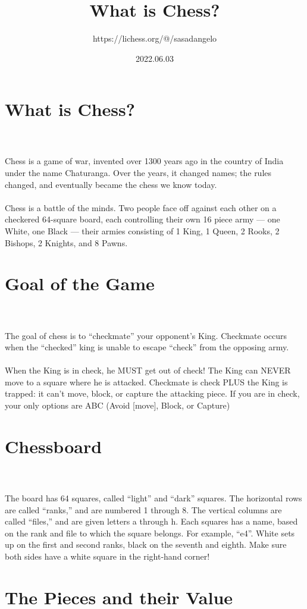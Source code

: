 \documentclass{article}
\title{What is Chess?}
\author{https://lichess.org/@/sasadangelo}
\date{2022.06.03}
\begin{document}
\begin{titlepage}
\maketitle
\end{titlepage}
\section{ What is Chess?}

\\
\\
Chess is a game of war, invented over 1300 years ago in the country of India under the name Chaturanga. Over the years, it changed names; the rules changed, and eventually became the chess we know today.\\\\Chess is a battle of the minds. Two people face off against each other on a checkered 64-square board, each controlling their own 16 piece army — one White, one Black — their armies consisting of 1 King, 1 Queen, 2 Rooks, 2\\Bishops, 2 Knights, and 8 Pawns.\section{ Goal of the Game}

\\
\\
The goal of chess is to “checkmate” your opponent’s King. Checkmate occurs when the “checked” king is unable to escape “check” from the opposing army.\\\\When the King is in check, he MUST get out of check! The King can NEVER move to a square where he is attacked. Checkmate is check PLUS the King is trapped: it can’t move, block, or capture the attacking piece. If you are in check, your only options are ABC (Avoid [move], Block, or Capture)\section{ Chessboard}

\\
\\
The board has 64 squares, called “light” and “dark” squares. The horizontal rows are called “ranks,” and are numbered 1 through 8. The vertical columns are called “files,” and are given letters a through h. Each squares has a name, based on the rank and file to which the square belongs. For example, “e4”. White sets up on the first and second ranks, black on the seventh and eighth. Make sure both sides have a white square in the right-hand corner!\section{ The Pieces and their Value}
\end{document}
